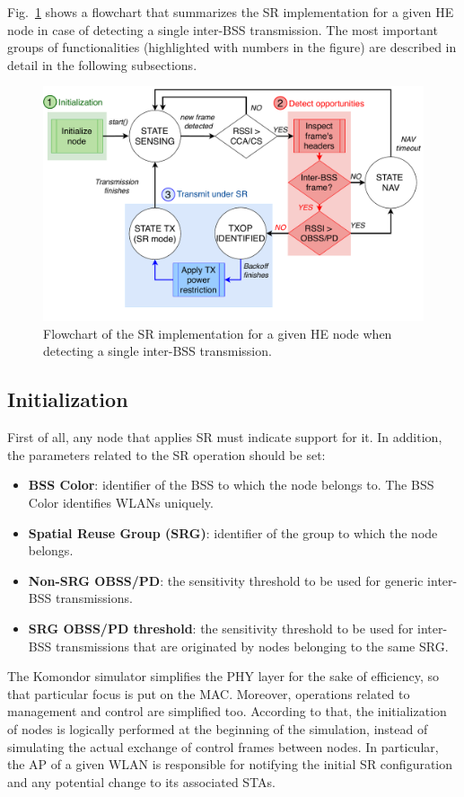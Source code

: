 \documentclass{article}
\begin{document}
	Fig.~\ref{fig:implementation_overview} shows a flowchart that summarizes the SR implementation for a given HE node in case of detecting a single inter-BSS transmission. The most important groups of functionalities (highlighted with numbers in the figure) are described in detail in the following subsections.
	
	\begin{figure}[h!!!!]
		\centering
		\includegraphics[width=0.9\columnwidth]{implementation_overview}
		\caption{Flowchart of the SR implementation for a given HE node when detecting a single inter-BSS transmission.}
		\label{fig:implementation_overview}
	\end{figure}
	
	\subsection{Initialization}
	First of all, any node that applies SR must indicate support for it. In addition, the parameters related to the SR operation should be set:
	\begin{itemize}
		\item \textbf{BSS Color}: identifier of the BSS to which the node belongs to. The BSS Color identifies WLANs uniquely.
		\item \textbf{Spatial Reuse Group (SRG)}: identifier of the group to which the node belongs.
		\item \textbf{Non-SRG OBSS/PD}: the sensitivity threshold to be used for generic inter-BSS transmissions.
		\item \textbf{SRG OBSS/PD threshold}: the sensitivity threshold to be used for inter-BSS transmissions that are originated by nodes belonging to the same SRG.
	\end{itemize}
	
	The Komondor simulator simplifies the PHY layer for the sake of efficiency, so that particular focus is put on the MAC. Moreover, operations related to management and control are simplified too. According to that, the initialization of nodes is logically performed at the beginning of the simulation, instead of simulating the actual exchange of control frames between nodes. In particular, the AP of a given WLAN is responsible for notifying the initial SR configuration and any potential change to its associated STAs.
\end{document}
